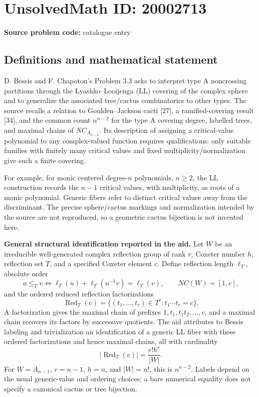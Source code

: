 \documentclass[11pt]{article}
\begin{document}
\section*{UnsolvedMath ID: 20002713}
\textbf{Source problem code:} catalogue entry
\subsection{Definitions and mathematical statement}
D. Bessis and F. Chapoton's Problem 3.3 asks to interpret type A noncrossing partitions through the Lyashko--Looijenga (LL) covering of the complex sphere and to generalize the associated tree/cactus combinatorics to other types. The source recalls a relation to Goulden--Jackson cacti [27], a ramified-covering result [34], and the common count \(n^{n-2}\) for the type A covering degree, labelled trees, and maximal chains of \(NC_{A_{n-1}}\). Its description of assigning a critical-value polynomial to any complex-valued function requires qualifications: only suitable families with finitely many critical values and fixed multiplicity/normalization give such a finite covering.

For example, for monic centered degree-\(n\) polynomials, \(n\ge2\), the LL construction records the \(n-1\) critical values, with multiplicity, as roots of a monic polynomial. Generic fibers refer to distinct critical values away from the discriminant. The precise sphere/cactus markings and normalization intended by the source are not reproduced, so a geometric cactus bijection is not invented here.

\textbf{General structural identification reported in the aid.} Let \(W\) be an irreducible well-generated complex reflection group of rank \(r\), Coxeter number \(h\), reflection set \(T\), and a specified Coxeter element \(c\). Define reflection length \(\ell_T\), absolute order
\[
 u\le_Tv\iff\ell_T(u)+\ell_T(u^{-1}v)=\ell_T(v),
 \qquad NC(W)=[1,c],
\]
and the ordered reduced reflection factorizations
\[
 \operatorname{Red}_T(c)=\{(t_1,\ldots,t_r)\in T^r:
                                      t_1\cdots t_r=c\}.
\]
A factorization gives the maximal chain of prefixes \(1,t_1,t_1t_2,\ldots,c\), and a maximal chain recovers its factors by successive quotients. The aid attributes to Bessis labeling and trivialization an identification of a generic LL fiber with these ordered factorizations and hence maximal chains, all with cardinality
\[
 |\operatorname{Red}_T(c)|=\frac{r!h^r}{|W|}.
\]
For \(W=A_{n-1}\), \(r=n-1\), \(h=n\), and \(|W|=n!\), this is \(n^{n-2}\). Labels depend on the usual generic-value and ordering choices; a bare numerical equality does not specify a canonical cactus or tree bijection.
\end{document}
